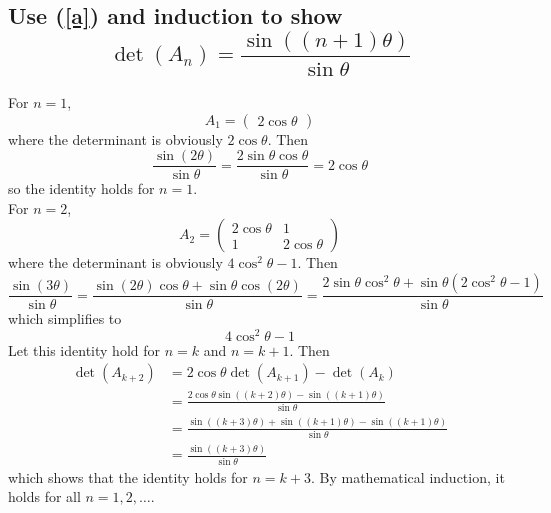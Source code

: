 \documentclass[answers]{exam}
\begin{document}
\begin{questions}
\begin{parts}
	\part{Use (\ref{a}) and induction to show
		$$\det(A_n) = \frac{\sin((n+1)\theta)}{\sin\theta}$$
	}

	\begin{solution}
		For $n=1$,
		$$A_1 = \begin{pmatrix} 2\cos\theta \end{pmatrix}$$
		where the determinant is obviously $2\cos\theta$. Then
		$$\frac{\sin(2\theta)}{\sin\theta} = \frac{2\sin\theta\cos\theta}{\sin\theta} = 2\cos\theta$$
		so the identity holds for $n=1$. \\
		For $n=2$, 
		$$A_2 = \begin{pmatrix} 2\cos\theta & 1 \\ 1 & 2\cos\theta\end{pmatrix}$$
		where the determinant is obviously $4\cos^2\theta - 1$. Then
		$$\frac{\sin(3\theta)}{\sin\theta} = \frac{\sin(2\theta)\cos\theta + \sin\theta\cos(2\theta)}{\sin\theta} = \frac{2\sin\theta\cos^2\theta + \sin\theta(2\cos^2\theta-1)}{\sin\theta}$$
		which simplifies to
		$$4\cos^2\theta - 1$$
		Let this identity hold for $n=k$ and $n=k+1$. Then
		\begin{align*}
			\det(A_{k+2}) &= 2\cos\theta\det(A_{k+1}) - \det(A_k) \\
				      &= \frac{2\cos\theta\sin((k+2)\theta) - \sin((k+1)\theta)}{\sin\theta} \\
				      &= \frac{\sin((k+3)\theta) + \sin((k+1)\theta) - \sin((k+1)\theta)}{\sin\theta} \\
				      &= \frac{\sin((k+3)\theta)}{\sin\theta}
		\end{align*}
		which shows that the identity holds for $n=k+3$. By mathematical induction, it holds for all $n = 1,2,\dots$.
	\end{solution}
		
\end{parts}



\end{questions}
\end{document}
